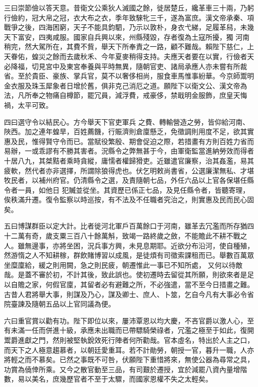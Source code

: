 \begin{pinyinscope}
 三曰崇節儉以答天意。昔衛文公乘狄人滅國之餘，徙居楚丘，纔革車三十兩，乃躬行儉約，冠大帛之冠，衣大布之衣，季年致騋牝三千，遂為富庶。漢文帝承秦、項戰爭之後，四海困窮，天子不能具鈞駟，乃示以敦朴，身衣弋綈，足履革舄，未幾天下富安，四夷咸服。國家自兵興以來，州縣殘毀，存者復為土寇所擾，獨
 河南稍完，然大駕所在，其費不貲，舉天下所奉責之一路，顧不難哉。賴陛下慈仁，上天眷佑，蝗災之餘而去歲秋禾、今年夏麥稍得支持。夫應天者要在以實，行儉者天必降福，切見宮中及東宮奉養與平時無異，隨朝官吏、諸局承應人亦未嘗有所裁省。至於貴臣、豪族、掌兵官，莫不以奢侈相尚，服食車馬惟事紛華。今京師鬻明金衣服及珠玉犀象者日增於舊，俱非克己消厄之道。願陛下以衛文公、漢文帝為法，凡所奉之物痛自樽節，罷冗員，減浮費，戒豪侈，禁戢明金服飾，庶皇天悔禍，太平可致。



 四曰選守令以結民心。方今舉天下官吏軍兵
 之費、轉輸營造之勞，皆仰給河南、陜西。加之連年蝗旱，百姓薦饑，行賑濟則倉廩懸乏，免徵調則用度不足，欲其實惠及民，惟得賢守令而已。當賦役繁殷、期會促迫之際，若措畫有方則百姓力省而易辦，一或乖謬有不勝其害者。況縣令之弊無甚于今，由軍衛監當進納勞效而得者十居八九，其桀黠者乘時貪縱，庸懦者權歸猾吏。近雖遣官廉察，治其姦濫，易其疲軟，然代者亦非選擇，所謂除狼得虎也。伏乞明敕尚書省，公選廉潔無私、才堪牧民者，以補州府官。仍清縣令之選，及責隨朝七品，外任六品以上官各保堪任縣令者一員，如他日
 犯贓並從坐。其資歷已係正七品，及見任縣令者，皆聽寄理，俟秩滿升遷。復令監察以時巡按，有不法及不任職者究治之，則實惠及民而民心固矣。



 五曰博謀群臣以定大計。比者徙河北軍戶百萬餘口于河南，雖革去冗濫而所存猶四十二萬有奇，歲支粟三百八十餘萬斛，致竭一路終歲之斂，不能贍此不耕不戰之人。雖無邊事，亦將坐困，況兵事方興，未見息期耶。近欲分布沿河，使自種殖，然游惰之人不知耕稼，群飲賭博習以成風，是徒煩有司徵索課租而已。舉數百萬眾坐糜廩給，緩之則用闕，急之則民疲，朝遷惟此一事已不知所處，
 又何以待敵哉。是蓋不審於初，不計其後，致此誤也。使初遷時去留從其所願，則欲來者是足以自贍之家，何假官廩，其留者必有避難之所，不必強遣，當不至今日措畫之難。古昔人君將舉大事，則謀及乃心，謀及卿士、庶人、卜筮，乞自今凡有大事必令省院臺諫及隨朝五品以上官同議為便。



 六曰重官賞以勸有功。陛下即位以來，屢沛覃恩以均大慶，不吝官爵以激人心，至有未滿一任而併進十級，承應未出職而已帶驃騎榮祿者，冗濫之極至于如此，復開鬻爵進獻之門，然則被堅執銳效死行陣者何所勸哉。官本虛名，特出於人主之口，
 而天下之人極意趨慕者，以朝廷愛重耳。若不計勛勞，朝授一官，暮升一職，人亦將輕之而不慕矣。已然之事既不可咎，伏願陛下重惜將來，無使公器為尋常之具，功賞為僥倖所乘。又今之散官動至三品，有司艱於遷授，宜於減罷八資內量增階數，易以美名，庶幾歷官者不至于太驟，而國家恩權不失之太輕矣。




\end{pinyinscope}
